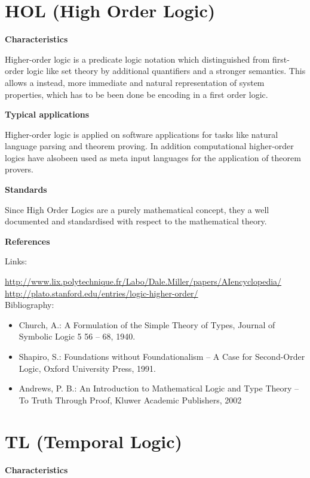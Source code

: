 \documentclass{./template/openetcs_report}
\begin{document}
\section{HOL (High Order Logic)}


	\textbf{Characteristics}

Higher-order logic is a predicate logic notation which distinguished from first-order logic like set theory by additional quantifiers and a stronger semantics. This allows a instead, more immediate and natural representation of system properties, which has to be been done be encoding in a first order logic.

	\textbf{Typical applications}


Higher-order logic is applied on software applications for tasks like natural language parsing and theorem proving. In addition computational higher-order logics have alsobeen used as meta input languages for the application of theorem provers. 

	\textbf{Standards}

Since High Order Logics are a purely mathematical concept, they a well documented and standardised with respect to the mathematical theory.

	\textbf{References}

Links:

\url{http://www.lix.polytechnique.fr/Labo/Dale.Miller/papers/AIencyclopedia/} \\[4pt]
\url{http://plato.stanford.edu/entries/logic-higher-order/} \\[4pt]

Bibliography:

\begin{itemize}
\item Church, A.: A Formulation of the Simple Theory of Types, Journal of Symbolic Logic 5 56 – 68, 1940.
\item Shapiro, S.: Foundations without Foundationalism -- A Case for Second-Order Logic, Oxford University Press, 1991.
\item Andrews, P. B.: An Introduction to Mathematical Logic and Type Theory -- To Truth Through Proof, Kluwer Academic Publishers, 2002
\end{itemize}

\section{TL (Temporal Logic)}


	\textbf{Characteristics}
\end{document}
